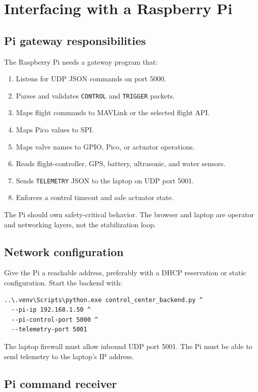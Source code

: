 \documentclass[11pt]{article}
\begin{document}
\section{Interfacing with a Raspberry Pi}

\subsection{Pi gateway responsibilities}

The Raspberry Pi needs a gateway program that:

\begin{enumerate}
\item Listens for UDP JSON commands on port 5000.
\item Parses and validates \texttt{CONTROL} and \texttt{TRIGGER} packets.
\item Maps flight commands to MAVLink or the selected flight API.
\item Maps Pico values to SPI.
\item Maps valve names to GPIO, Pico, or actuator operations.
\item Reads flight-controller, GPS, battery, ultrasonic, and water sensors.
\item Sends \texttt{TELEMETRY} JSON to the laptop on UDP port 5001.
\item Enforces a control timeout and safe actuator state.
\end{enumerate}

The Pi should own safety-critical behavior. The browser and laptop are
operator and networking layers, not the stabilization loop.

\subsection{Network configuration}

Give the Pi a reachable address, preferably with a DHCP reservation or static
configuration. Start the backend with:

\begin{lstlisting}
..\.venv\Scripts\python.exe control_center_backend.py ^
  --pi-ip 192.168.1.50 ^
  --pi-control-port 5000 ^
  --telemetry-port 5001
\end{lstlisting}

The laptop firewall must allow inbound UDP port 5001. The Pi must be able to
send telemetry to the laptop's IP address.

\subsection{Pi command receiver}
\end{document}
